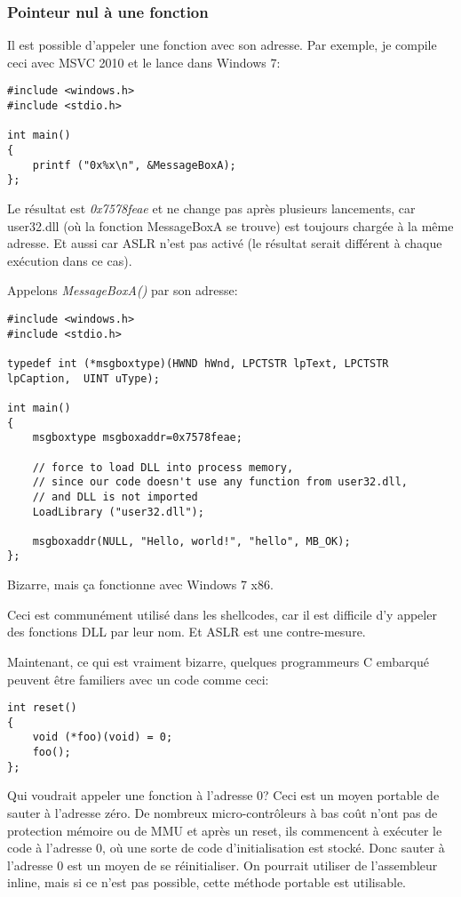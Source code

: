 \subsubsection{Pointeur nul à une fonction}

Il est possible d'appeler une fonction avec son adresse.
Par exemple, je compile ceci avec MSVC 2010 et le lance dans Windows 7:

\begin{lstlisting}[style=customc]
#include <windows.h>
#include <stdio.h>

int main()
{
	printf ("0x%x\n", &MessageBoxA);
};
\end{lstlisting}

Le résultat est \emph{0x7578feae} et ne change pas après plusieurs lancements, car user32.dll
(où la fonction MessageBoxA se trouve) est toujours chargée à la même adresse.
Et aussi car \ac{ASLR} n'est pas activé (le résultat serait différent à chaque exécution
dans ce cas).

Appelons \emph{MessageBoxA()} par son adresse:

\begin{lstlisting}[style=customc]
#include <windows.h>
#include <stdio.h>

typedef int (*msgboxtype)(HWND hWnd, LPCTSTR lpText, LPCTSTR lpCaption,  UINT uType);

int main()
{
	msgboxtype msgboxaddr=0x7578feae;

	// force to load DLL into process memory, 
	// since our code doesn't use any function from user32.dll, 
	// and DLL is not imported
	LoadLibrary ("user32.dll");

	msgboxaddr(NULL, "Hello, world!", "hello", MB_OK);
};
\end{lstlisting}

Bizarre, mais ça fonctionne avec Windows 7 x86.

Ceci est communément utilisé dans les shellcodes, car il est difficile d'y appeler
des fonctions DLL par leur nom.
Et \ac{ASLR} est une contre-mesure.

Maintenant, ce qui est vraiment bizarre, quelques programmeurs C embarqué peuvent
être familiers avec un code comme ceci:

\begin{lstlisting}[style=customc]
int reset()
{
	void (*foo)(void) = 0;
	foo();
};
\end{lstlisting}

Qui voudrait appeler une fonction à l'adresse 0?
Ceci est un moyen portable de sauter à l'adresse zéro.
De nombreux micro-contrôleurs à bas coût n'ont pas de protection mémoire ou de \ac{MMU}
et après un reset, ils commencent à exécuter le code à l'adresse 0, où une sorte
de code d'initialisation est stocké.
Donc sauter à l'adresse 0 est un moyen de se réinitialiser.
On pourrait utiliser de l'assembleur inline, mais si ce n'est pas possible, cette
méthode portable est utilisable.

